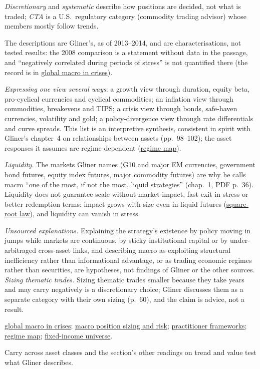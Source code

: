\begin{qfdefinition}
 \emph{Discretionary} and \emph{systematic} describe how positions are decided, not what is traded; \emph{CTA} is a U.S.\ regulatory category (commodity trading advisor) whose members mostly follow trends.

 The descriptions are Gliner's, as of 2013--2014, and are characterisations, not tested results: the 2008 comparison is a statement without data in the passage, and ``negatively correlated during periods of stress'' is not quantified there (the record is in \hyperref[ev:global-macro-crisis-performance]{global macro in crises}).

 \emph{Expressing one view several ways}: a growth view through duration, equity beta, pro-cyclical currencies and cyclical commodities; an inflation view through commodities, breakevens and TIPS; a crisis view through bonds, safe-haven currencies, volatility and gold; a policy-divergence view through rate differentials and curve spreads. This list is an interpretive synthesis, consistent in spirit with Gliner's chapter~4 on relationships between assets (pp.~98--102); the asset responses it assumes are regime-dependent (\hyperref[def:macro-regime-asset-map]{regime map}).

\emph{Liquidity.} The markets Gliner names (G10 and major EM currencies, government bond futures, equity index futures, major commodity futures) are why he calls macro ``one of the most, if not the most, liquid strategies'' (chap.~1, PDF p.~36). Liquidity does not guarantee scale without market impact, fast exit in stress or better redemption terms: impact grows with size even in liquid futures (\hyperref[ev:square-root-impact]{square-root law}), and liquidity can vanish in stress.

 \emph{Unsourced explanations.} Explaining the strategy's existence by policy moving in jumps while markets are continuous, by sticky institutional capital or by under-arbitraged cross-asset links, and describing macro as exploiting structural inefficiency rather than informational advantage, or as trading economic regimes rather than securities, are hypotheses, not findings of Gliner or the other sources. \emph{Sizing thematic trades.} Sizing thematic trades smaller because they take years and may carry negatively is a discretionary choice; Gliner discusses them as a separate category with their own sizing (p.~60), and the claim is advice, not a result.

 \hyperref[ev:global-macro-crisis-performance]{global macro in crises}; \hyperref[meth:macro-position-sizing-risk]{macro position sizing and risk}; \hyperref[meth:macro-practitioner-frameworks]{practitioner frameworks}; \hyperref[def:macro-regime-asset-map]{regime map}; \hyperref[def:fixed-income-universe]{fixed-income universe}.

 Carry across asset classes \citep{alpha-carry} and the section's other readings on trend and value test what Gliner describes.

\end{qfdefinition}

